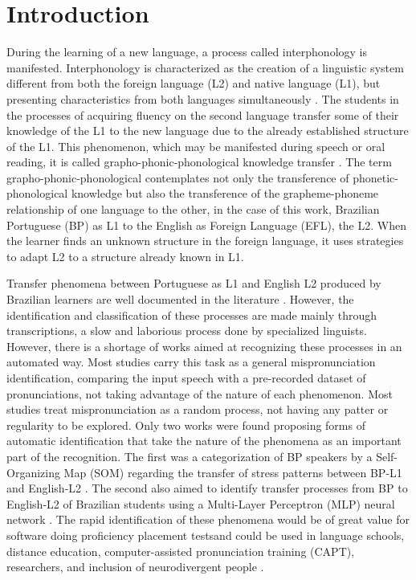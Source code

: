 \section{Introduction}
During the learning of a new language, a process called interphonology is
manifested. Interphonology is characterized as the creation of a linguistic
system different from both the foreign language (L2) and native language (L1),
but presenting characteristics from both languages simultaneously
\citep{rocha_os_2012}. The students in the processes of acquiring fluency on
the second language transfer some of their knowledge of the L1 to the new
language due to the already established structure of the L1. This phenomenon,
which may be manifested during speech or oral reading, it is called
grapho-phonic-phonological knowledge transfer \citep{zimmer_producao_2006}.
The term grapho-phonic-phonological contemplates not only the transference of
phonetic-phonological knowledge but also the transference of the
grapheme-phoneme relationship of one language to the other, in the case of
this work, Brazilian Portuguese (BP) as L1 to the English as Foreign Language
(EFL), the L2. When the learner finds an unknown structure in the foreign
language, it uses strategies to adapt L2 to a structure already known in L1.

Transfer phenomena between Portuguese as L1 and English L2 produced by
Brazilian learners are well documented in the literature
\citep{silveira_efeito_2021}. However, the identification and classification of
these processes are made mainly through transcriptions, a slow and laborious
process done by specialized linguists. However, there is a shortage of works
aimed at recognizing these processes in an automated way. Most studies carry
this task as a general mispronunciation identification, comparing the input
speech with a pre-recorded dataset of pronunciations, not taking advantage of
the nature of each phenomenon. Most studies treat mispronunciation as a random
process, not having any patter or regularity to be explored. Only two works
were found proposing forms of automatic identification that take the nature of
the phenomena as an important part of the recognition. The first was a
categorization of BP speakers by a Self-Organizing Map (SOM) regarding the
transfer of stress patterns between BP-L1 and English-L2
\citep{silva_som-based_2011}. The second also aimed to identify transfer
processes from BP to English-L2 of Brazilian students using a Multi-Layer
Perceptron (MLP) neural network \citep{rocha_identificacao_2017}. The rapid
identification of these phenomena would be of great value for software doing
proficiency placement testsand could be used in language schools, distance
education, computer-assisted pronunciation training (CAPT), researchers, and
inclusion of neurodivergent people \citep{grund_2020}.

